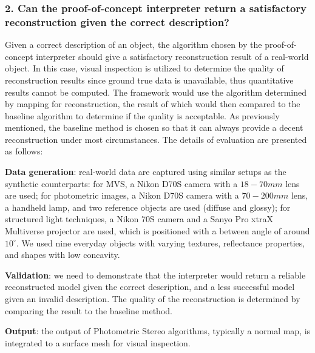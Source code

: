 \subsubsection{2. Can the proof-of-concept interpreter return a satisfactory reconstruction given the correct description?}
Given a correct description of an object, the algorithm chosen by the proof-of-concept interpreter should give a satisfactory reconstruction result of a real-world object. In this case, visual inspection is utilized to determine the quality of reconstruction results since ground true data is unavailable, thus quantitative results cannot be computed. The framework would use the algorithm determined by mapping for reconstruction, the result of which would then compared to the baseline algorithm to determine if the quality is acceptable. As previously mentioned, the baseline method is chosen so that it can always provide a decent reconstruction under most circumstances. The details of evaluation are presented as follows:

\noindent\textbf{Data generation}: real-world data are captured using similar setups as the synthetic counterparts: for MVS, a Nikon D70S camera with a $18-70mm$ lens are used; for photometric images, a Nikon D70S camera with a $70-200mm$ lens, a handheld lamp, and two reference objects are used (diffuse and glossy); for structured light techniques, a Nikon 70S camera and a Sanyo Pro xtraX Multiverse projector are used, which is positioned with a between angle of around $10^\circ$. We used nine everyday objects with varying textures, reflectance properties, and shapes with low concavity.

\noindent\textbf{Validation}: we need to demonstrate that the interpreter would return a reliable reconstructed model given the correct description, and a less successful model given an invalid description. The quality of the reconstruction is determined by comparing the result to the baseline method.

\noindent\textbf{Output}: the output of Photometric Stereo algorithms, typically a normal map, is integrated to a surface mesh for visual inspection.


